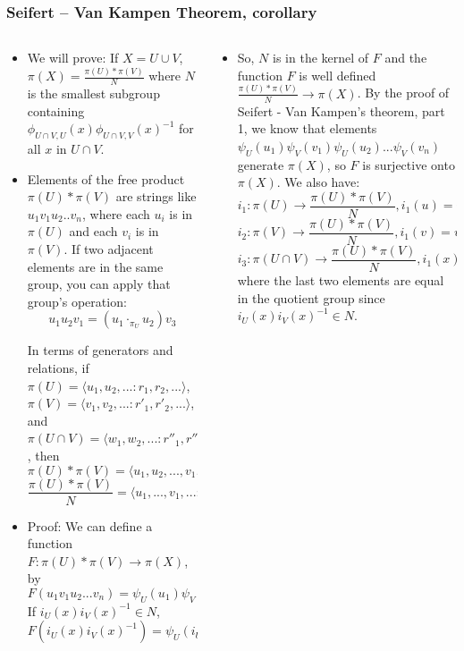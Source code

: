 \documentclass[8pt]{beamer}
\begin{document}
  \begin{frame}
    \frametitle{Seifert -- Van Kampen Theorem, corollary}

    \begin{columns}
      \begin{column}[T]{0.5\textwidth}
        \begin{itemize}
          \item<1-> We will prove: If $X = U \cup V$, $\pi(X) = \frac{\pi(U) *
            \pi(V)}{N}$ where $N$ is the smallest subgroup containing $\phi_{U
            \cap V, U}(x)\phi_{U \cap V, V}(x)^{-1}$ for all $x$ in $U \cap V$.
          \item<2-> Elements of the free product $\pi(U) * \pi(V)$ are strings like
            $u_1v_1u_2..v_n$, where each $u_i$ is in $\pi(U)$ and each $v_i$ is
            in $\pi(V)$. If two adjacent elements are in the same group, you can
            apply that group's operation:
            \[u_1u_2v_1 = (u_1 \cdot_{\pi_U}u_2)v_3\]
            
            In terms of generators and relations, if $\pi(U) = \langle u_1, u_2,
            ...: r_1, r_2, ...\rangle $, $\pi(V) = \langle v_1, v_2, ...: r'_1,
            r'_2, ...\rangle $, and $\pi(U \cap V) = \langle w_1, w_2, ...:
            r''_1, r''_2, ...\rangle $, then
          \[\pi(U)*\pi(V) = \langle u_1, u_2, ..., v_1, v_2, ... : r_1, r_2,
            ..., r'_1, r'_2, ...\rangle \]
          \[\frac{\pi(U) * \pi(V)}{N} = \langle u_1, ..., v_1, ... : r_1, ...,
            r'_1, ..., i_U(w_1)i_V(w_1)^{-1}, ...\rangle \]

          \item<3-> Proof: We can define a function $F : \pi(U) * \pi(V) \rightarrow \pi(X)$, by
            \[F(u_1v_1u_2...v_n) = \psi_U(u_1)\psi_V(v_1)\psi_U(u_2) ... \psi_V(v_n)\]
            If $i_U(x)i_V(x)^{-1} \in N$,
            \[F(i_U(x)i_V(x)^{-1}) = \psi_U(i_U(x))\psi_V(i_V(x))^{-1} = 1\]
          \end{itemize}
        \end{column}
        \begin{column}[T]{0.5\textwidth}
          \begin{itemize}

            \item<4-> So, $N$ is in the kernel of $F$ and the function $F$ is well
              defined $\frac{\pi(U)*\pi(V)}{N} \rightarrow \pi(X)$.
              By the proof of Seifert - Van Kampen's theorem, part 1, we know
              that elements $\psi_U(u_1)\psi_V(v_1)\psi_U(u_2) ... \psi_V(v_n)$
              generate $\pi(X)$, so $F$ is surjective onto $\pi(X)$.
              We also have:
              \[i_1: \pi(U) \rightarrow \frac{\pi(U)*\pi(V)}{N}, i_1(u) = u\]
              \[i_2: \pi(V) \rightarrow \frac{\pi(U)*\pi(V)}{N}, i_1(v) = v\]
              \[i_3: \pi(U \cap V) \rightarrow \frac{\pi(U)*\pi(V)}{N}, i_1(x)
              = i_U(x) = i_V(x)\]
            where the last two elements are equal in the quotient group since
              $i_U(x)i_V(x)^{-1} \in N$.


\end{itemize}
\end{column}
\end{columns}
\end{frame}
\end{document}
